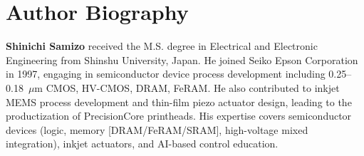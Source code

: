 \documentclass[conference]{IEEEtran}
\begin{document}
\section*{Author Biography}
\textbf{Shinichi Samizo} received the M.S. degree in Electrical and Electronic Engineering from Shinshu University, Japan. He joined Seiko Epson Corporation in 1997, engaging in semiconductor device process development including 0.25--0.18~$\mu$m CMOS, HV-CMOS, DRAM, FeRAM. He also contributed to inkjet MEMS process development and thin-film piezo actuator design, leading to the productization of PrecisionCore printheads. His expertise covers semiconductor devices (logic, memory [DRAM/FeRAM/SRAM], high-voltage mixed integration), inkjet actuators, and AI-based control education.
\end{document}
